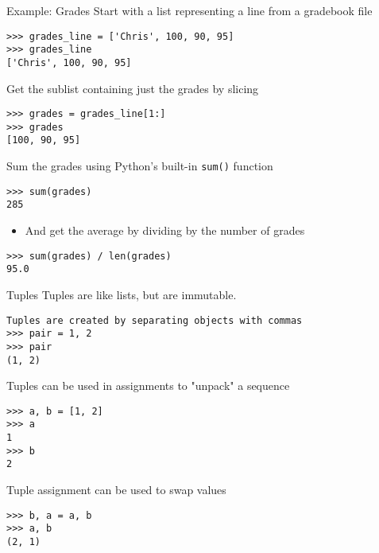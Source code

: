 \documentclass[smaller]{beamer}
\begin{document}
\begin{frame}[label={sec:org5ad63ed},fragile]{Example: Grades}
 Start with a list representing a line from a gradebook file

\lstset{language=Python,label= ,caption= ,captionpos=b,numbers=none}
\begin{lstlisting}
>>> grades_line = ['Chris', 100, 90, 95]
>>> grades_line
['Chris', 100, 90, 95]
\end{lstlisting}

Get the sublist containing just the grades by slicing

\lstset{language=Python,label= ,caption= ,captionpos=b,numbers=none}
\begin{lstlisting}
>>> grades = grades_line[1:]
>>> grades
[100, 90, 95]
\end{lstlisting}

Sum the grades using Python's built-in \texttt{sum()} function

\lstset{language=Python,label= ,caption= ,captionpos=b,numbers=none}
\begin{lstlisting}
>>> sum(grades)
285
\end{lstlisting}

\begin{itemize}
\item And get the average by dividing by the number of grades
\end{itemize}

\lstset{language=Python,label= ,caption= ,captionpos=b,numbers=none}
\begin{lstlisting}
>>> sum(grades) / len(grades)
95.0
\end{lstlisting}
\end{frame}

\begin{frame}[label={sec:orgca77040},fragile]{Tuples}
 Tuples are like lists, but are immutable.

\lstset{language=Python,label= ,caption= ,captionpos=b,numbers=none}
\begin{lstlisting}
Tuples are created by separating objects with commas
>>> pair = 1, 2
>>> pair
(1, 2)
\end{lstlisting}

Tuples can be used in assignments to "unpack" a sequence

\lstset{language=Python,label= ,caption= ,captionpos=b,numbers=none}
\begin{lstlisting}
>>> a, b = [1, 2]
>>> a
1
>>> b
2
\end{lstlisting}

Tuple assignment can be used to swap values

\lstset{language=Python,label= ,caption= ,captionpos=b,numbers=none}
\begin{lstlisting}
>>> b, a = a, b
>>> a, b
(2, 1)
\end{lstlisting}
\end{frame}
\end{document}
